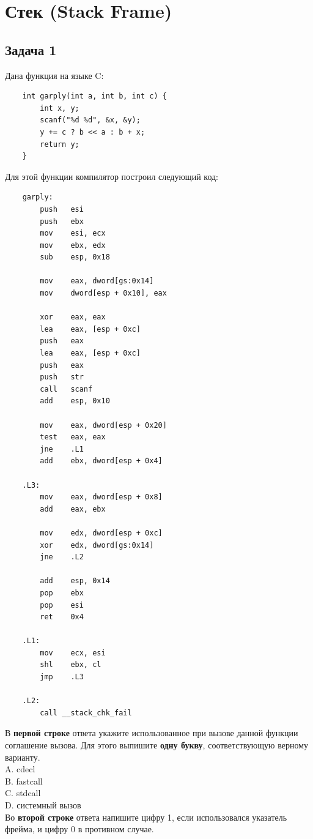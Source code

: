 \documentclass[12pt, letterpaper]{article}
\begin{document}
\section{Стек (Stack Frame)}
\subsection{Задача 1}
Дана функция на языке C:
\begin{verbatim}
    int garply(int a, int b, int c) {
        int x, y;
        scanf("%d %d", &x, &y);
        y += c ? b << a : b + x;
        return y;
    }
\end{verbatim}

Для этой функции компилятор построил следующий код:
\begin{verbatim}
    garply:
        push   esi
        push   ebx
        mov    esi, ecx
        mov    ebx, edx
        sub    esp, 0x18
    
        mov    eax, dword[gs:0x14]
        mov    dword[esp + 0x10], eax
    
        xor    eax, eax
        lea    eax, [esp + 0xc]
        push   eax
        lea    eax, [esp + 0xc]
        push   eax
        push   str
        call   scanf
        add    esp, 0x10
    
        mov    eax, dword[esp + 0x20]
        test   eax, eax
        jne    .L1
        add    ebx, dword[esp + 0x4]
    
    .L3:
        mov    eax, dword[esp + 0x8]
        add    eax, ebx
    
        mov    edx, dword[esp + 0xc]
        xor    edx, dword[gs:0x14]
        jne    .L2
    
        add    esp, 0x14
        pop    ebx
        pop    esi
        ret    0x4
    
    .L1:
        mov    ecx, esi
        shl    ebx, cl
        jmp    .L3
    
    .L2:
        call __stack_chk_fail
\end{verbatim}
В \textbf{первой строке} ответа укажите использованное при вызове данной функции соглашение вызова. Для этого выпишите \textbf{одну букву}, соответствующую верному варианту.\\
A. cdecl\\
B. fastcall\\
C. stdcall\\
D. системный вызов\\

Во \textbf{второй строке} ответа напишите цифру 1, если использовался указатель фрейма, и цифру 0 в противном случае.\\
\end{document}
